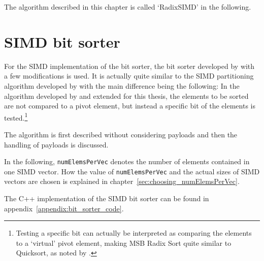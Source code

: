 \documentclass[12pt, a4paper, openright, twoside]{tiarbeit}
\begin{document}
The algorithm described in this chapter is called `RadixSIMD' in the following.

\section{SIMD bit sorter}

For the SIMD implementation of the bit sorter, the bit sorter developed
by \citet{moeller_radix} with a few modifications is used.
It is actually quite similar to the SIMD partitioning algorithm developed
by \citet{bramas} with the main difference being the following:
In the algorithm
developed by \citet{moeller_radix} and extended for this thesis, the elements to be
sorted are not compared to a pivot element, but instead a specific bit of the elements
is tested.\footnote{Testing a specific bit can actually be interpreted as
  comparing the elements to a `virtual' pivot element, making MSB Radix Sort
  quite similar to Quicksort, as noted by \citet[p. 128]{knuth_taocp}.}

The algorithm is first described without considering payloads and
then the handling of payloads is discussed.

In the following, \texttt{numElemsPerVec} denotes the number of elements
contained in one SIMD vector. How the value of \texttt{numElemsPerVec} and the
actual sizes of SIMD vectors are
chosen is explained in chapter~\ref{sec:choosing_numElemsPerVec}.

The C++ implementation of the SIMD bit sorter can be found in
appendix~\ref{appendix:bit_sorter_code}.
\end{document}
